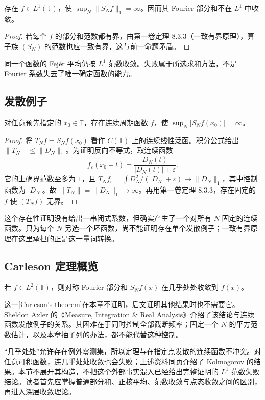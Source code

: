 \begin{corollary}\label{b2:cor:02-l1-failure}
存在 \(f\in L^1(\mathbb T)\)，使 \(\sup_N\|S_Nf\|_1=\infty\)。因而其 Fourier 部分和不在 \(L^1\) 中收敛。
\end{corollary}
\begin{proof}
若每个 \(f\) 的部分和范数都有界，由第一卷定理 8.3.3（一致有界原理），算子族 \((S_N)\) 的范数也应一致有界，这与前一命题矛盾。
\end{proof}

同一个函数的 Fejér 平均仍按 \(L^1\) 范数收敛。失败属于所选求和方法，不是 Fourier 系数失去了唯一确定函数的能力。

\subsection{发散例子}
\label{b2:subsec:020703}

\begin{proposition}\label{b2:prop:02-continuous-divergence}
对任意预先指定的 \(x_0\in\mathbb T\)，存在连续周期函数 \(f\)，使 \(\sup_N|S_Nf(x_0)|=\infty\)。
\end{proposition}
\begin{proof}
将 \(T_Nf=S_Nf(x_0)\) 看作 \(C(\mathbb T)\) 上的连续线性泛函。积分公式给出 \(\|T_N\|\leq\|D_N\|_1\)。为证明反向不等式，取连续函数
\[
 f_\varepsilon(x_0-t)=\dfrac{D_N(t)}{|D_N(t)|+\varepsilon}.
\]
它的上确界范数至多为 \(1\)，且 \(T_Nf_\varepsilon=\int D_N^2/(|D_N|+\varepsilon)\to\|D_N\|_1\)，其中控制函数为 \(|D_N|\)。故 \(\|T_N\|=\|D_N\|_1\to\infty\)。再用第一卷定理 8.3.3，存在固定的 \(f\) 使 \((T_Nf)\) 无界。
\end{proof}

这个存在性证明没有给出一串闭式系数，但确实产生了一个对所有 \(N\) 固定的连续函数。只为每个 \(N\) 另选一个坏函数，尚不能证明存在单个发散例子；一致有界原理在这里承担的正是这一量词转换。

\subsection{Carleson 定理概览}
\label{b2:subsec:020704}

\begin{claim}\label{b2:claim:02-carleson}
若 \(f\in L^2(\mathbb T)\)，则对称 Fourier 部分和 \(S_Nf(x)\) 在几乎处处收敛到 \(f(x)\)。
\end{claim}

这一[Carleson's theorem]在本章不证明，后文证明其他结果时也不需要它。Sheldon Axler 的《Measure, Integration \& Real Analysis》\cite[p. 352; Section 11B]{Axler2020Measure}介绍了该结论与连续函数发散例子的关系。其困难在于同时控制全部截断频率；固定一个 \(N\) 的平方范数估计，以及本章抽子列的办法，都不能代替这种控制。

\ProseParagraphBreak

“几乎处处”允许存在例外零测集，所以定理与在指定点发散的连续函数不冲突。对任意可积函数，连几乎处处收敛也会失败；上述资料同页介绍了 Kolmogorov 的结果。本节不展开其构造，不把这个外部事实混入已经给出完整证明的 \(L^1\) 范数失败结论。读者首先应掌握普通部分和、正核平均、范数收敛与点态收敛之间的区别，再进入深层收敛理论。
